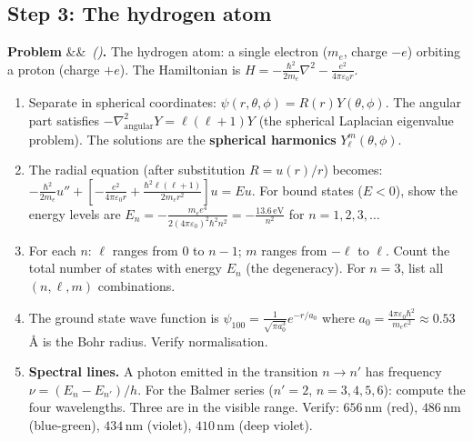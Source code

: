 \documentclass[12pt,a4paper]{article}
\newcounter{problem}
\newenvironment{problem}[1][]{\refstepcounter{problem}\par\vspace{6pt}\noindent\textbf{\color{MidBlue}Problem \theproblem}\ifx&#1&\else\ \textit{(#1)}\fi\textbf{.}\enskip}{\par\vspace{4pt}}
\begin{document}
\subsection{Step 3: The hydrogen atom}

\begin{problem}
\label{prob:hydrogen}
The hydrogen atom: a single electron ($m_e$, charge $-e$) orbiting a proton (charge $+e$). The Hamiltonian is $H = -\frac{\hbar^2}{2m_e}\nabla^2 - \frac{e^2}{4\pi\varepsilon_0 r}$.

\begin{enumerate}[label=(\alph*),topsep=2pt]
  \item Separate in spherical coordinates: $\psi(r,\theta,\phi) = R(r)Y(\theta,\phi)$. The angular part satisfies $-\nabla_{\text{angular}}^2 Y = \ell(\ell+1)Y$ (the spherical Laplacian eigenvalue problem). The solutions are the \textbf{spherical harmonics} $Y_\ell^m(\theta,\phi)$.
  \item The radial equation (after substitution $R = u(r)/r$) becomes:
  $-\frac{\hbar^2}{2m_e}u'' + \left[-\frac{e^2}{4\pi\varepsilon_0 r} + \frac{\hbar^2\ell(\ell+1)}{2m_e r^2}\right]u = Eu$.
  For bound states ($E<0$), show the energy levels are $E_n = -\frac{m_e e^4}{2(4\pi\varepsilon_0)^2\hbar^2 n^2} = -\frac{13.6\,\text{eV}}{n^2}$ for $n=1,2,3,\ldots$
  \item For each $n$: $\ell$ ranges from $0$ to $n-1$; $m$ ranges from $-\ell$ to $\ell$. Count the total number of states with energy $E_n$ (the degeneracy). For $n=3$, list all $(n,\ell,m)$ combinations.
  \item The ground state wave function is $\psi_{100} = \frac{1}{\sqrt{\pi a_0^3}}e^{-r/a_0}$ where $a_0 = \frac{4\pi\varepsilon_0\hbar^2}{m_e e^2} \approx 0.53$ \AA\/ is the Bohr radius. Verify normalisation.
  \item \textbf{Spectral lines.} A photon emitted in the transition $n\to n'$ has frequency $\nu = (E_n-E_{n'})/h$. For the Balmer series ($n'=2$, $n=3,4,5,6$): compute the four wavelengths. Three are in the visible range. Verify: $656\,\text{nm}$ (red), $486\,\text{nm}$ (blue-green), $434\,\text{nm}$ (violet), $410\,\text{nm}$ (deep violet).
\end{enumerate}
\end{problem}
\end{document}
